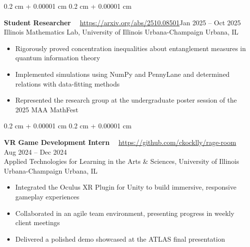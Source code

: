 \documentclass[10pt, letterpaper]{article}
\newenvironment{highlights}{
    \begin{itemize}[
        topsep=0 cm,
        parsep=0 cm,
        partopsep=0pt,
        itemsep=0pt,
        leftmargin=0.4 cm + 10pt
    ]
}{
    \end{itemize}
} %
\newenvironment{onecolentry}{
    \begin{adjustwidth}{
        0.2 cm + 0.00001 cm
    }{
        0.2 cm + 0.00001 cm
    }
}{
    \end{adjustwidth}
} %
\let\hrefWithoutArrow\href
\renewcommand{\href}[2]{\hrefWithoutArrow{#1}{\ifthenelse{\equal{#2}{}}{ }{#2 }\raisebox{.15ex}{\footnotesize \faExternalLink*}}}
\begin{document}
        \vspace{0.2cm}

        \begin{onecolentry}
            \textbf{Student Researcher}\ \,\raisebox{-1.5pt}{\rule{1.2pt}{10pt}}\ \,\hrefWithoutArrow{https://arxiv.org/abs/2510.08501}{\ul{https://arxiv.org/abs/2510.08501}}\hfill Jan 2025 -- Oct 2025 \\
            Illinois Mathematics Lab, University of Illinois Urbana-Champaign \hfill Urbana, IL

            \begin{highlights}
                \item Rigorously proved concentration inequalities about entanglement measures in quantum information theory
                \item Implemented simulations using NumPy and PennyLane and determined relations with data-fitting methods
                \item Represented the research group at the undergraduate poster session of the 2025 MAA MathFest
            \end{highlights}
        \end{onecolentry}

        \vspace{0.2cm}

        \begin{onecolentry}
            \textbf{VR Game Development Intern}\ \,\raisebox{-1.5pt}{\rule{1.2pt}{10pt}}\ \,\hrefWithoutArrow{https://github.com/ckocklly/rage-room}{\ul{https://github.com/ckocklly/rage-room}} \hfill Aug 2024 -- Dec 2024 \\
            Applied Technologies for Learning in the Arts \& Sciences, University of Illinois Urbana-Champaign \hfill Urbana, IL
            
            \begin{highlights}
                \item Integrated the Oculus XR Plugin for Unity to build immersive, responsive gameplay experiences
                \item Collaborated in an agile team environment, presenting progress in weekly client meetings
                \item Delivered a polished demo showcased at the ATLAS final presentation
            \end{highlights}
        \end{onecolentry}

        \vspace{0.2cm}
\end{document}
